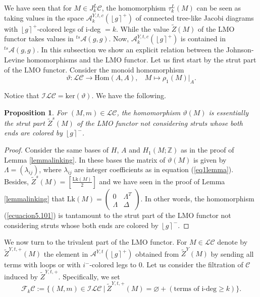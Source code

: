\documentclass[10pt]{amsart}
\numberwithin{equation}{section}
\numberwithin{equation}{section}
\newtheorem{proposition}[theorem]{Proposition}
\theoremstyle{definition}
\begin{document}
We have seen that for $M\in J_k^L\mathcal{C}$, the homomorphism $\tau_k^L(M)$ can be seen as  taking  values in the space  $\mathcal{A}_k^{Y,t,c}(\left\lfloor g\right\rceil^+)$ of connected tree-like Jacobi diagrams  with $\left\lfloor g\right\rceil^+$-colored legs of i-deg $=k$. While  the value $\widetilde{Z}(M)$ of the LMO functor takes values in ${}^{ts}\!\!\mathcal{A}(g,g)$. Now,  $\mathcal{A}_k^{Y,t,c}(\left\lfloor g\right\rceil^+)$ is contained in ${}^{ts}\!\!\mathcal{A}(g,g)$. In this subsection we show an explicit relation between the Johnson-Levine homomorphisms and the LMO functor. Let us first start by the strut part of the LMO functor. Consider  the monoid homomorphism
\begin{equation}\label{ecuacion5.101}%
\vartheta:\mathcal{LC}\longrightarrow \text{Hom}(A,A), \ \ \ \ M\longmapsto \rho_1(M)|_A.
\end{equation}

Notice that $\mathcal{ILC}=\text{ker}(\vartheta)$. We have the following.

\begin{proposition} For $(M,m)\in\mathcal{LC}$, the homomorphism $\vartheta(M)$ is essentially the strut part $\widetilde{Z}^s(M)$ of the LMO functor not considering struts whose both ends are colored by $\left\lfloor g\right\rceil^-$.
\end{proposition}
\begin{proof}
Consider the same bases of $H$, $A$ and $H_1(M;\mathbb{Z})$ as in the proof of Lemma \ref{lemmalinking}. In these bases the matrix of $\vartheta(M)$ is given by $\Lambda=(\lambda_{ij})$, where $\lambda_{ij}$ are integer coefficients  as in  equation (\ref{eq1lemma}). Besides, $\widetilde{Z}^s(M)=\left[\frac{\text{Lk}(M)}{2}\right]$ and we have seen in the proof of Lemma \ref{lemmalinking} that 
$\text{Lk}(M)=\left( \begin{smallmatrix} 0 & \Lambda^T\\ \Lambda & \Delta \end{smallmatrix} \right)$. In other words, the homomorphism (\ref{ecuacion5.101}) is tantamount to the strut part of the LMO functor not considering struts whose both ends are colored by $\left\lfloor g \right\rceil^-$.
\end{proof}
 

We now turn to the  trivalent part of the LMO functor. For $M\in\mathcal{LC}$ denote by $\widetilde{Z}^{Y,t,+}(M)$ the element in $\mathcal{A}^{Y,t}(\left\lfloor g\right\rceil^+)$ obtained from $\widetilde{Z}^{Y}(M)$ by sending all terms with loops or with $i^{-}$-colored legs to $0$. 
Let us consider the filtration of $\mathcal{C}$ induced by $\widetilde{Z}^{Y,t,+}$. Specifically, we set 
$$\mathcal{F}_k\mathcal{C}:=\{(M,m)\in \mathcal{ILC}\ |\ \widetilde{Z}^{Y,t,+}(M)=\varnothing + (\text{terms of } \text{i-deg}\geq k) \}.$$
\end{document}
